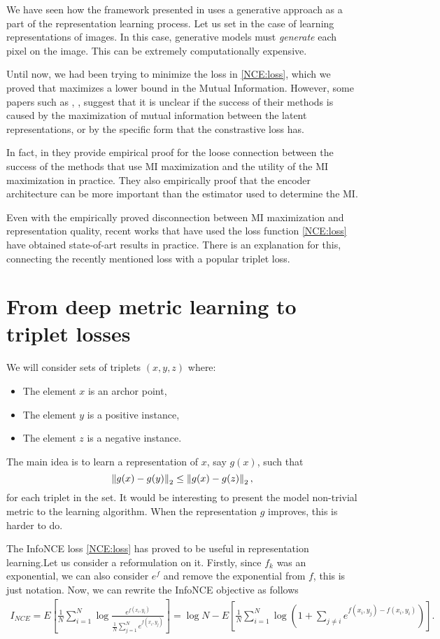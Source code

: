 
We have seen how the framework presented in \cite{oord_et_al} uses a generative approach as a part of the representation learning process. Let us set in the case of learning representations of images. In this case, generative models must \emph{generate} each pixel on the image. This can be extremely computationally expensive. 

Until now, we had been trying to minimize the loss in \ref{NCE:loss}, which we proved that maximizes a lower bound in the Mutual Information. However, some papers such as \cite{chen_simple_2020}, \cite{tschannen_mutual_2020}, suggest that it is unclear if the success of their methods is caused by the maximization of mutual information between the latent representations, or by the specific form that the constrastive loss has.

In fact, in \cite{tschannen_mutual_2020} they provide empirical proof for the loose connection between the success of the methods that use MI maximization and the utility of the MI maximization in practice. They also empirically proof  that the encoder architecture can be more important than the estimator used to determine the MI.

Even with the empirically proved disconnection between MI maximization and representation quality, recent works that have used the loss function \ref{NCE:loss} have obtained state-of-art results in practice. There is an explanation for this, connecting the recently mentioned loss with a popular triplet loss.

\section{From deep metric learning to triplet losses}

We will consider sets of triplets $(x,y,z)$ where:
\begin{itemize}
\item The element $x$ is an archor point,
\item The element $y$ is a positive instance,
\item The element $z$ is a negative instance.
\end{itemize}
The main idea is to learn a representation of $x$, say $g(x)$, such that 
$$
\left\lVert g(x) - g(y)\right\rVert_2 \leq \left\lVert g(x) - g(z)\right\rVert_2,
$$
for each triplet in the set. It would be interesting to present the model non-trivial metric to the learning algorithm. When the representation $g$ improves, this is harder to do.

The InfoNCE loss \ref{NCE:loss} has proved to be useful in representation learning.Let us consider a reformulation on it. Firstly, since $f_k$ was an exponential, we can also consider $e^f$ and remove the exponential from $f$, this is just notation. Now, we can rewrite the InfoNCE objective as follows
\begin{align*}
I_{NCE} = E\left[ \frac{1}{N} \sum_{i = 1}^N \log \frac{e^{f(x_i,y_i)}}{\frac{1}{N}\sum_{j=1}^N e^{f(x_i,y_j)}}\right] = \log N - E\left[ \frac{1}{N} \sum_{i=1}^N \log \left( 1+ \sum_{j\neq i}e^{f(x_i,y_j)- f(x_i,y_i)}\right)\right].
\end{align*}

